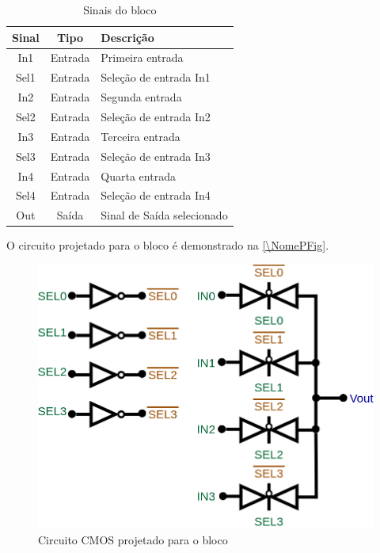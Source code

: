 \begin{table}[htbp]
\caption{Sinais do bloco \NomeBloco}
\label{\NomeSTab}
\centering
\begin{tabular}{ccl}

    \toprule
    Sinal & Tipo    & Descri{\c c}\~ao        \\
    \midrule \midrule
    In1    & Entrada & Primeira entrada \\
    \midrule
    Sel1    & Entrada & Sele{\c c}\~ao de entrada In1 \\
    \midrule
    In2    & Entrada & Segunda entrada \\
    \midrule
    Sel2    & Entrada & Sele{\c c}\~ao de entrada In2 \\
    \midrule
    In3    & Entrada & Terceira entrada \\
    \midrule
    Sel3    & Entrada & Sele{\c c}\~ao de entrada In3 \\
    \midrule
    In4    & Entrada & Quarta entrada \\
    \midrule
    Sel4    & Entrada & Sele{\c c}\~ao de entrada In4 \\
    \midrule
    Out   & Saída   & Sinal de Sa\'ida selecionado   \\
    \bottomrule
\end{tabular}
\end{table}

O circuito projetado para o bloco \'e demonstrado na \autoref{\NomePFig}.

\begin{figure}[htb]
 \label{NomePFig}
 \centering
    \centering
    \caption{Circuito CMOS projetado para o bloco \NomeBloco} \label{\NomePFig}
    \includegraphics[scale=0.3]{Circuitos/sel4x1.png}
\end{figure}

